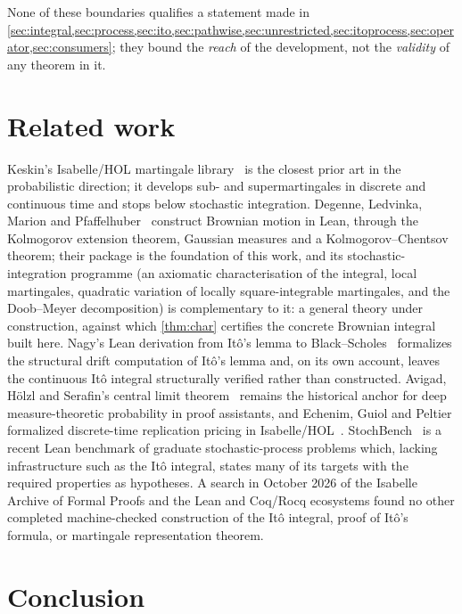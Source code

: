 \documentclass[11pt]{article}
\begin{document}
None of these boundaries qualifies a statement made in \cref{sec:integral,sec:process,sec:ito,sec:pathwise,sec:unrestricted,sec:itoprocess,sec:operator,sec:consumers};
they bound the \emph{reach} of the development, not the \emph{validity} of any theorem in it.

\section{Related work}\label{sec:related}

Keskin's Isabelle/HOL martingale library~\cite{Keskin2023} is the closest prior art in the probabilistic direction;
it develops sub- and supermartingales in discrete and continuous time and stops below stochastic integration. Degenne,
Ledvinka, Marion and Pfaffelhuber~\cite{DegenneEtAl2025,BrownianMotionRepo} construct Brownian motion in Lean, through
the Kolmogorov extension theorem, Gaussian measures and a Kolmogorov--Chentsov theorem; their package is the foundation
of this work, and its stochastic-integration programme (an axiomatic characterisation of the integral, local
martingales, quadratic variation of locally square-integrable martingales, and the Doob--Meyer decomposition) is
complementary to it: a general theory under construction, against which \cref{thm:char} certifies the concrete
Brownian integral built here. Nagy's Lean derivation from It\^o's lemma to Black--Scholes~\cite{Nagy2026} formalizes the
structural drift computation of It\^o's lemma and, on its own account, leaves the continuous It\^o integral
structurally verified rather than constructed. Avigad, H\"olzl and Serafin's central limit theorem~\cite{AvigadHolzlSerafin2017}
remains the historical anchor for deep measure-theoretic probability in proof assistants, and Echenim, Guiol and
Peltier formalized discrete-time replication pricing in Isabelle/HOL~\cite{EchenimGuiolPeltier2020}. StochBench~\cite{StochBench2026}
is a recent Lean benchmark of graduate stochastic-process problems which, lacking infrastructure such as the It\^o
integral, states many of its targets with the required properties as hypotheses. A search in October 2026 of the
Isabelle Archive of Formal Proofs and the Lean and Coq/Rocq ecosystems found no other completed machine-checked
construction of the It\^o integral, proof of It\^o's formula, or martingale representation theorem.

\section{Conclusion}\label{sec:conclusion}
\end{document}
